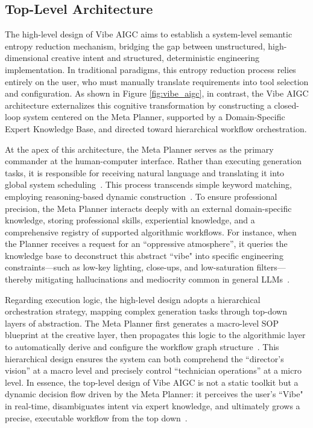 \documentclass{article}
\begin{document}
\subsection{Top-Level Architecture}

The high-level design of Vibe AIGC aims to establish a system-level semantic entropy reduction mechanism, bridging the gap between unstructured, high-dimensional creative intent and structured, deterministic engineering implementation. In traditional paradigms, this entropy reduction process relies entirely on the user, who must manually translate requirements into tool selection and configuration. As shown in Figure \ref{fig:vibe_aigc}, in contrast, the Vibe AIGC architecture externalizes this cognitive transformation by constructing a closed-loop system centered on the Meta Planner, supported by a Domain-Specific Expert Knowledge Base, and directed toward hierarchical workflow orchestration.

At the apex of this architecture, the Meta Planner serves as the primary commander at the human-computer interface. Rather than executing generation tasks, it is responsible for receiving natural language and translating it into global system scheduling~\citep{jiang2025screencoderadvancingvisualtocodegeneration}. This process transcends simple keyword matching, employing reasoning-based dynamic construction~\citep{xiong2025selforganizingagentnetworkllmbased}. To ensure professional precision, the Meta Planner interacts deeply with an external domain-specific knowledge, storing professional skills, experiential knowledge, and a comprehensive registry of supported algorithmic workflows. For instance, when the Planner receives a request for an ``oppressive atmosphere'', it queries the knowledge base to deconstruct this abstract ``vibe" into specific engineering constraints—such as low-key lighting, close-ups, and low-saturation filters—thereby mitigating hallucinations and mediocrity common in general LLMs~\citep{li2025agentorientedplanningmultiagentsystems}.

Regarding execution logic, the high-level design adopts a hierarchical orchestration strategy, mapping complex generation tasks through top-down layers of abstraction. The Meta Planner first generates a macro-level SOP blueprint at the creative layer, then propagates this logic to the algorithmic layer to automatically derive and configure the workflow graph structure~\citep{qiu2025blueprintfirstmodelsecond}. This hierarchical design ensures the system can both comprehend the ``director’s vision'' at a macro level and precisely control ``technician operations'' at a micro level. In essence, the top-level design of Vibe AIGC is not a static toolkit but a dynamic decision flow driven by the Meta Planner: it perceives the user's ``Vibe" in real-time, disambiguates intent via expert knowledge, and ultimately grows a precise, executable workflow from the top down~\citep{xiong2025selforganizingagentnetworkllmbased}.
\end{document}
